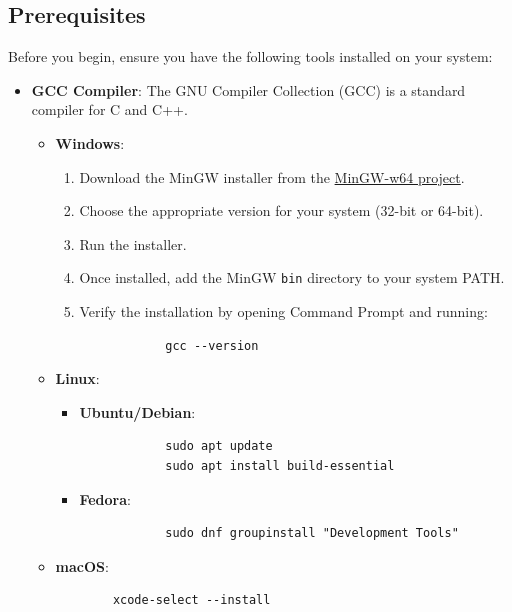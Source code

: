 \documentclass[12pt,a4paper]{report}
\begin{document}
\subsection{Prerequisites}
Before you begin, ensure you have the following tools installed on your system:
\begin{itemize}
    \item \normalsize \textbf{GCC Compiler}: The GNU Compiler Collection (GCC) is a standard compiler for C and C++.
    \begin{itemize}
        \item \normalsize \textbf{Windows}:
        \begin{enumerate}
            \item Download the MinGW installer from the \href{https://sourceforge.net/projects/mingw/files/latest/download}{MinGW-w64 project}.
            \item Choose the appropriate version for your system (32-bit or 64-bit).
            \item Run the installer.
            \item Once installed, add the MinGW \texttt{bin} directory to your system PATH.\
            \item Verify the installation by opening Command Prompt and running:
            \begin{verbatim}
            gcc --version
            \end{verbatim}
        \end{enumerate}
        \item \normalsize \textbf{Linux}:
        \begin{itemize}
            \item \normalsize \textbf{Ubuntu/Debian}:
            \begin{verbatim}
            sudo apt update
            sudo apt install build-essential
            \end{verbatim}
            \item \normalsize \textbf{Fedora}:
            \begin{verbatim}
            sudo dnf groupinstall "Development Tools"
            \end{verbatim}
        \end{itemize}
        \item \normalsize \textbf{macOS}:
        \begin{verbatim}
        xcode-select --install
        \end{verbatim}
    \end{itemize}

\end{itemize}
\end{document}
